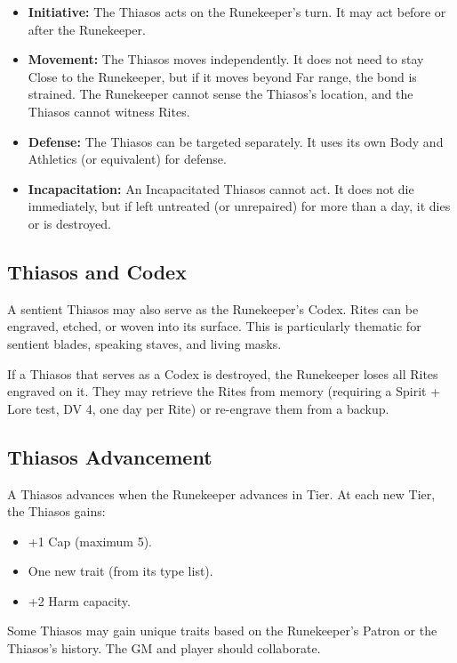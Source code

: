 \begin{itemize}
\item \textbf{Initiative:} The Thiasos acts on the Runekeeper's turn. It may act before or after the Runekeeper.
\item \textbf{Movement:} The Thiasos moves independently. It does not need to stay Close to the Runekeeper, but if it moves beyond Far range, the bond is strained. The Runekeeper cannot sense the Thiasos's location, and the Thiasos cannot witness Rites.
\item \textbf{Defense:} The Thiasos can be targeted separately. It uses its own Body and Athletics (or equivalent) for defense.
\item \textbf{Incapacitation:} An Incapacitated Thiasos cannot act. It does not die immediately, but if left untreated (or unrepaired) for more than a day, it dies or is destroyed.
\end{itemize}

\subsection{Thiasos and Codex}

A sentient Thiasos may also serve as the Runekeeper's Codex. Rites can be engraved, etched, or woven into its surface. This is particularly thematic for sentient blades, speaking staves, and living masks.

If a Thiasos that serves as a Codex is destroyed, the Runekeeper loses all Rites engraved on it. They may retrieve the Rites from memory (requiring a Spirit + Lore test, DV 4, one day per Rite) or re-engrave them from a backup.

\subsection{Thiasos Advancement}

A Thiasos advances when the Runekeeper advances in Tier. At each new Tier, the Thiasos gains:

\begin{itemize}
\item +1 Cap (maximum 5).
\item One new trait (from its type list).
\item +2 Harm capacity.
\end{itemize}

Some Thiasos may gain unique traits based on the Runekeeper's Patron or the Thiasos's history. The GM and player should collaborate.

